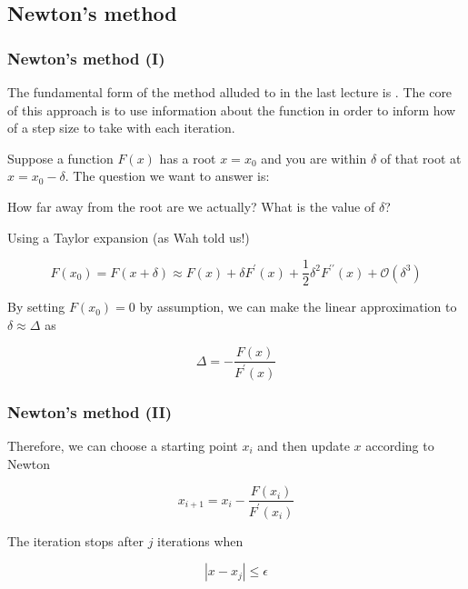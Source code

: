 \documentclass[hyperref={colorlinks=true}]{beamer}
\begin{document}
\subsection[Newton's method]{Newton's method}

\begin{frame}%
  \frametitle{Newton's method (I)}

  The fundamental form of the method alluded to in the last lecture is . The core of this approach is to use information about the function in order to inform how  of a step size to take with each iteration.
  
  \mysp
  
  Suppose a function $F(x)$ has a root $ x = x_0$ and you are within $\delta$ of that root at $x = x_0 - \delta$. The question we want to answer is: 
  
  \mysp
  
  \begin{ucblock}{}
    How far away from the root are we actually? What is the value of $\delta$?
  \end{ucblock}
  
  \mysp
  
  Using a Taylor expansion (as Wah told us!) 
  
  \begin{equation}
    F(x_0) = F(x+\delta) \approx F(x) + \delta F^{\prime}(x) + \frac{1}{2}\delta^2 F^{\prime\prime}(x) + \mathcal{O}(\delta^3)
  \end{equation}
  
  By setting $F(x_0) = 0$ by assumption, we can make the linear approximation to $\delta \approx \Delta$ as
  
  \begin{equation}
    \Delta = - \frac{F(x)}{F^{\prime}(x)}
  \end{equation}
  
\end{frame}


\begin{frame}%
  \frametitle{Newton's method (II)}

  Therefore, we can choose a starting point $x_i$ and then update $x$ according to Newton
  
  \mysp
  
  \begin{equation}
    x_{i+1} = x_{i} - \frac{F(x_i)}{F^{\prime}(x_i)}
  \end{equation}
  
  The iteration stops after $j$ iterations when 
  
  \begin{equation}
   | x - x_j | \leq \epsilon
  \end{equation}  
\end{frame}
\end{document}
